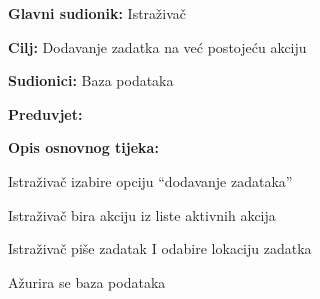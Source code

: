 					\noindent {}
					\begin{packed_item}
	
						\item \textbf{Glavni sudionik: } Istraživač
						\item  \textbf{Cilj:} Dodavanje zadatka na već postojeću akciju
						\item  \textbf{Sudionici:} Baza podataka
						\item  \textbf{Preduvjet:}
						\item  \textbf{Opis osnovnog tijeka:}
						
						\item[] \begin{packed_enum}
	
							\item Istraživač izabire opciju “dodavanje zadataka”
							\item	Istraživač bira akciju iz liste aktivnih akcija
							\item	Istraživač piše zadatak I odabire lokaciju zadatka
							\item	Ažurira se baza podataka
							
						\end{packed_enum}
					\end{packed_item}%
					\noindent {}
